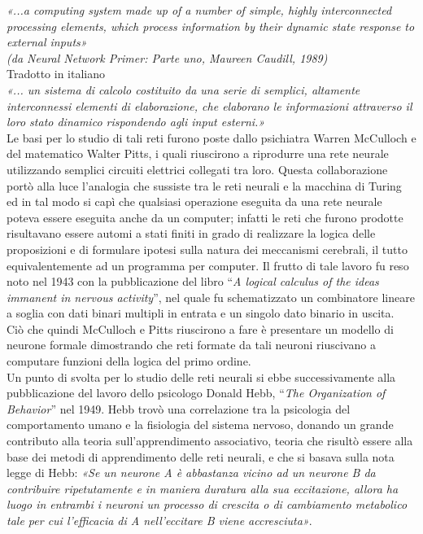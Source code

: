 \documentclass[12pt,a4paper,oneside]{book}
\begin{document}
		\textit{«...a computing system made up of a number of simple, highly interconnected processing elements, which process information by their dynamic state response to external inputs»}\\
		\textit{(da Neural Network Primer: Parte uno, Maureen Caudill, 1989)}\\
		
		Tradotto in italiano \\
		\textit{«... un sistema di calcolo costituito da una serie di semplici, altamente interconnessi elementi di elaborazione, che elaborano le informazioni attraverso il loro stato dinamico rispondendo agli input esterni.»}\\
		
		Le basi per lo studio di tali reti furono poste dallo psichiatra Warren McCulloch e del matematico Walter Pitts, i quali riuscirono a riprodurre una rete neurale utilizzando semplici circuiti elettrici collegati tra loro. Questa collaborazione portò alla luce l'analogia che sussiste tra le reti neurali e la macchina di Turing ed in tal modo si capì che qualsiasi operazione eseguita da una rete neurale poteva essere eseguita anche da un computer; infatti le reti che furono prodotte risultavano essere automi a stati finiti in grado di realizzare la logica delle proposizioni e di formulare ipotesi sulla natura dei meccanismi cerebrali, il tutto equivalentemente ad un programma per computer. Il frutto di tale lavoro fu reso noto nel 1943 con la pubblicazione del libro ``\emph{A logical calculus of the ideas immanent in nervous activity}'', nel quale fu schematizzato un combinatore lineare a soglia con dati binari multipli in entrata e un singolo dato binario in uscita.\\
	    Ciò che quindi McCulloch e Pitts riuscirono a fare è presentare un modello di neurone formale dimostrando che reti formate da tali neuroni riuscivano a computare funzioni della logica del primo ordine.\\
	    Un punto di svolta per lo studio delle reti neurali si ebbe successivamente alla pubblicazione del lavoro dello psicologo Donald Hebb, ``\emph{The Organization of Behavior}'' nel 1949. Hebb trovò una correlazione tra la psicologia del comportamento umano e la fisiologia del sistema nervoso, donando un grande contributo alla teoria sull'apprendimento associativo, teoria che risultò essere alla base dei metodi di apprendimento delle reti neurali, e che si basava sulla nota legge di Hebb: \textit{«Se un neurone A è abbastanza vicino ad un neurone B da contribuire ripetutamente e in maniera duratura alla sua eccitazione, allora ha luogo in entrambi i neuroni un processo di crescita o di cambiamento metabolico tale per cui l'efficacia di A nell'eccitare B viene accresciuta»}.\\
\end{document}
